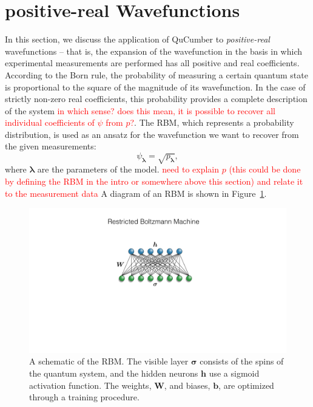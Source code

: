\documentclass[submission, Phys]{SciPost}
\begin{document}



\section{positive-real Wavefunctions}

In this section, we discuss the application of QuCumber to {\it positive-real} wavefunctions --
that is, the expansion of the wavefunction in the basis in which experimental measurements are performed has all positive and real coefficients.
According to the Born rule, the probability of measuring a certain quantum state is proportional to the square of the magnitude of its wavefunction.  
In the case of strictly non-zero real coefficients, this probability provides a complete description of the system \textcolor{red}{in which sense? does this mean, it is possible to recover all individual coefficients of $\psi$ from $p$?}. 
The RBM, which represents a probability distribution, is used as an ansatz for the wavefunction we want to recover from the given measurements:
\begin{equation}
    \psi_{\bm{\lambda}}= \sqrt{p_{\bm{\lambda}}} \label{wfpd},
\end{equation}  
where ${\bm \lambda}$ are the parameters of the model. \textcolor{red}{need to explain $p$ (this could be done by defining the RBM in the intro or somewhere above this section) and relate it to the measurement data}
A diagram of an RBM is shown in Figure~\ref{fig:RBM}.

\begin{figure}[htpb]
    \centering
    \includegraphics[width=0.5\linewidth]{plots/ch3_positiveNW.pdf}
    \caption{A schematic of the RBM. 
        The visible layer $\bm{\sigma}$ consists of the spins of the quantum system,    
        and the hidden neurons $\bm{h}$ use a sigmoid activation function. 
    The weights, $\bm{W}$, and biases, $\bm{b}$, are optimized through a training procedure.  }
    \label{fig:RBM}
\end{figure}
\end{document}
